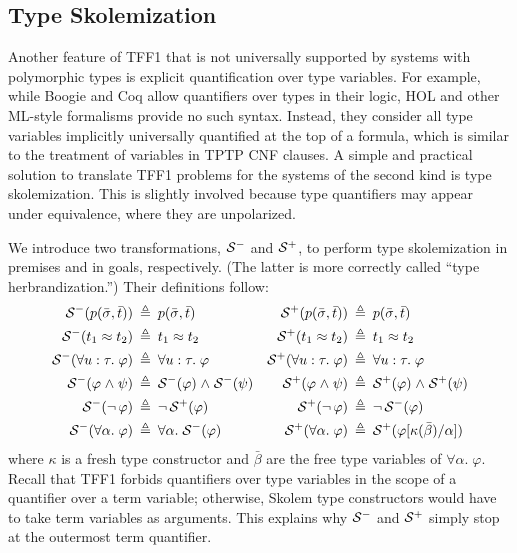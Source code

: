 \subsection{Type Skolemization} \label{ssec:skol}

Another feature of TFF1 that is not universally supported
by systems with polymorphic types is explicit
quantification over type variables.
For example, while Boogie and Coq \cite{CoqManualV8}
allow quantifiers over types in their logic,
HOL and other ML-style formalisms provide no such syntax.
Instead, they consider all type variables
implicitly universally quantified at the top of a formula, which is similar to
the treatment of variables in TPTP CNF clauses.
A simple and practical solution to translate TFF1 problems
for the systems of the second kind is type skolemization. This is slightly
involved because type quantifiers may appear under equivalence, where they are
unpolarized.

We introduce two transformations, $\mathcal{S}^-$ and $\mathcal{S}^+$, to perform type
skolemization in premises and in goals, respectively. (The latter is more
correctly called ``type herbrandization.'')
Their definitions follow:
\begin{align*}
\mathcal{S}^-(p(\bar{\sigma},\bar{t})) &\:\triangleq\: p(\bar{\sigma},\bar{t}) &
\mathcal{S}^+(p(\bar{\sigma},\bar{t})) &\:\triangleq\: p(\bar{\sigma},\bar{t}) \\
\mathcal{S}^-(t_1 \approx t_2) &\:\triangleq\: t_1 \approx t_2 &
\mathcal{S}^+(t_1 \approx t_2) &\:\triangleq\: t_1 \approx t_2 \\
\mathcal{S}^-(\forall u \mathrel{:} \tau .\; \varphi) &\:\triangleq\: \forall u \mathrel{:} \tau .\; \varphi &
\mathcal{S}^+(\forall u \mathrel{:} \tau .\; \varphi) &\:\triangleq\: \forall u \mathrel{:} \tau .\; \varphi \\
\mathcal{S}^-(\varphi \mathrel{\land} \psi) &\:\triangleq\: \mathcal{S}^-(\varphi) \mathrel{\land} \mathcal{S}^-(\psi) &
\mathcal{S}^+(\varphi \mathrel{\land} \psi) &\:\triangleq\: \mathcal{S}^+(\varphi) \mathrel{\land} \mathcal{S}^+(\psi) \\
\mathcal{S}^-(\lnot\, \varphi) &\:\triangleq\: \lnot\, \mathcal{S}^+(\varphi) &
\mathcal{S}^+(\lnot\, \varphi) &\:\triangleq\: \lnot\, \mathcal{S}^-(\varphi) \\
\mathcal{S}^-(\forall \alpha .\; \varphi) &\:\triangleq\: \forall \alpha .\; \mathcal{S}^-(\varphi) &
\mathcal{S}^+(\forall \alpha .\; \varphi) &\:\triangleq\:
\mathcal{S}^+(\varphi[\kappa(\bar\beta)/\alpha])
\end{align*}
where $\kappa$ is a fresh type constructor and $\bar\beta$ are
the free type variables of $\forall \alpha .\; \varphi$.
Recall that TFF1 forbids quantifiers over type variables in the scope
of a quantifier over a term variable; otherwise, Skolem type constructors
would have to take term variables as arguments. This explains why $\mathcal{S}^-$ and
$\mathcal{S}^+$ simply stop at the outermost term quantifier.

